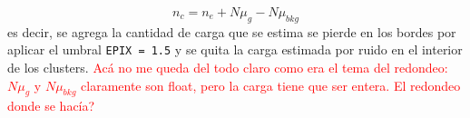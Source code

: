 \begin{equation*}
    n_{c} = n_{e} + N\mu_{g} - N\mu_{bkg}
\end{equation*}
es decir, se agrega la cantidad de carga que se estima se pierde en los bordes por aplicar el umbral \verb|EPIX = 1.5| y se quita la carga estimada por ruido en el interior de los clusters. \textcolor{red}{Acá no me queda del todo claro como era el tema del redondeo: $N\mu_{g}$ y $N\mu_{bkg}$ claramente son float, pero la carga tiene que ser entera. El redondeo donde se hacía?}
